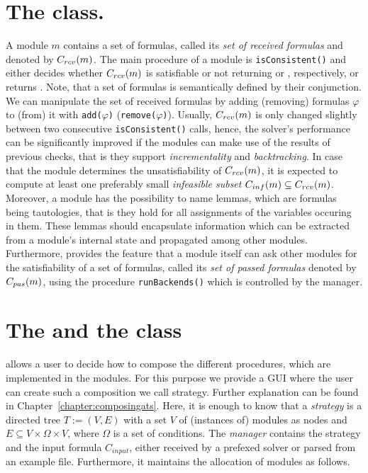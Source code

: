 \section{The \moduleClass class.} A module $m$ contains a set of
formulas, called its \emph{set of received formulas} and denoted by 
$C_{rcv}(m)$. The main
procedure of a module  is \texttt{isConsistent()} and either decides
whether $C_{rcv}(m)$ is satisfiable or not returning \SAT or \UNSAT,
respectively, or returns \UNKNOWN. Note, that a set of formulas is
semantically defined by their conjunction. We can manipulate the set
of received formulas by adding (removing) formulas $\varphi$ to (from)
it with \texttt{add($\varphi$)} (\texttt{remove($\varphi$)}). Usually, 
$C_{rcv}(m)$ is only changed slightly between two consecutive 
\texttt{isConsistent()} calls, hence, the solver's performance can be significantly improved if the modules can
make use of the results of previous checks, that is they support
\emph{incrementality} and \emph{backtracking}. In case that the module
determines the unsatisfiability of $C_{rcv}(m)$, it is expected to compute
at least one preferably small \emph{infeasible subset} $C_{inf}(m)\subseteq
C_{rcv}(m)$. Moreover, a module has the possibility to name lemmas, which
are formulas being tautologies, that is they hold for all assignments
of the variables occuring in them. These lemmas should encapsulate
information which can be extracted from a module's internal state and
propagated among other \smtrat modules. Furthermore, \smtrat provides
the feature that a module itself can ask other modules for the
satisfiability of a set of formulas, called its \emph{set
of passed formulas} denoted by $C_{pas}(m)$, using the procedure \texttt{runBackends()} which
is controlled by the manager. 

\section{The \managerClass and the \strategyClass class} 
\smtrat allows a user to decide how to compose the different procedures,
which are implemented in the modules. For this purpose we provide a GUI
where the user can create such a composition we call strategy. Further
explanation can be found in Chapter~\ref{chapter:composingats}. Here, 
it is enough to know that a \emph{strategy} is a directed tree $T:=(V, E)$ with a set $V$ of
(instances of) modules as nodes and $E\subseteq V\times \Omega\times V$,
where $\Omega$ is a set of conditions. The \emph{manager} contains the
strategy and the input formula $C_{input}$, either received by a prefexed solver
or parsed from an example file. Furthermore, it maintains the
allocation of modules as follows. 

